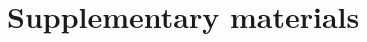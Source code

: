 \documentclass[a4paper, 12pt]{article}
\newcommand{\checkit}[1]{{\color{red}#1}}
\begin{document}






\appendix

\section{Supplementary materials}
\end{document}
